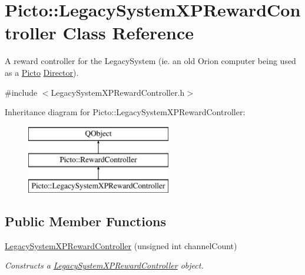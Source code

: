 \hypertarget{class_picto_1_1_legacy_system_x_p_reward_controller}{\section{Picto\-:\-:Legacy\-System\-X\-P\-Reward\-Controller Class Reference}
\label{class_picto_1_1_legacy_system_x_p_reward_controller}
}


A reward controller for the Legacy\-System (ie. an old Orion computer being used as a \hyperlink{namespace_picto}{Picto} \hyperlink{class_director}{Director}).  




{\ttfamily \#include $<$Legacy\-System\-X\-P\-Reward\-Controller.\-h$>$}

Inheritance diagram for Picto\-:\-:Legacy\-System\-X\-P\-Reward\-Controller\-:\begin{figure}[H]
\begin{center}
\leavevmode
\includegraphics[height=3.000000cm]{class_picto_1_1_legacy_system_x_p_reward_controller}
\end{center}
\end{figure}
\subsection*{Public Member Functions}
\begin{DoxyCompactItemize}
\item 
\hyperlink{class_picto_1_1_legacy_system_x_p_reward_controller_aa4bf911d9be6b952859875a501cebed6}{Legacy\-System\-X\-P\-Reward\-Controller} (unsigned int channel\-Count)
\begin{DoxyCompactList}\small\item\em Constructs a \hyperlink{class_picto_1_1_legacy_system_x_p_reward_controller}{Legacy\-System\-X\-P\-Reward\-Controller} object. \end{DoxyCompactList}\end{DoxyCompactItemize}
